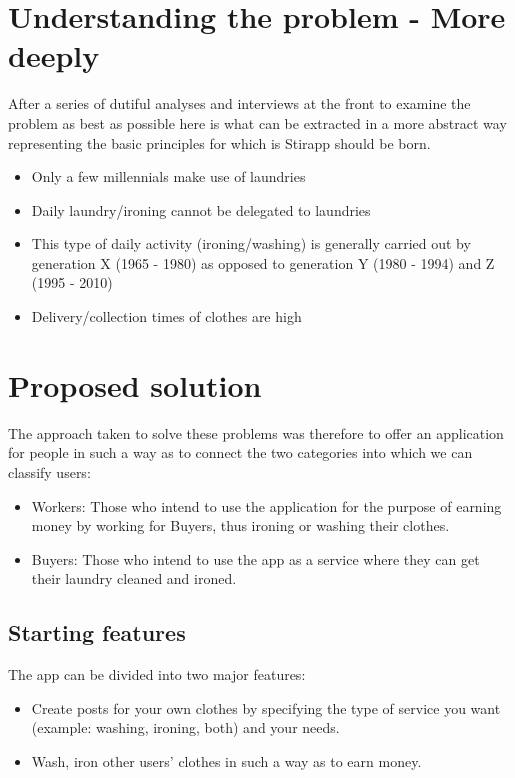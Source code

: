 \section{Understanding the problem - More deeply}
After a series of dutiful analyses and interviews at the front to examine the problem as best as possible here is what can be extracted in a more abstract way representing the basic principles for which is Stirapp should be born.
\begin{itemize}
\item Only a few millennials make use of laundries
\item Daily laundry/ironing cannot be delegated to laundries
\item This type of daily activity (ironing/washing) is generally carried out by generation X (1965 - 1980) as opposed to generation Y (1980 - 1994) and Z (1995 - 2010)
\item Delivery/collection times of clothes are high
\end{itemize}
\section{Proposed solution}
The approach taken to solve these problems was therefore to offer an application for people in such a way as to connect the two categories into which we can classify users:
\begin{itemize}
\item Workers: Those who intend to use the application for the purpose of earning money by working for Buyers, thus ironing or washing their clothes.
\item Buyers: Those who intend to use the app as a service where they can get their laundry cleaned and ironed.
\end{itemize}
\subsection{Starting features}
The app can be divided into two major features:
\begin{itemize}
\item Create posts for your own clothes by specifying the type of service you want (example: washing, ironing, both) and your needs.
\item Wash, iron other users' clothes in such a way as to earn money.
\end{itemize}
